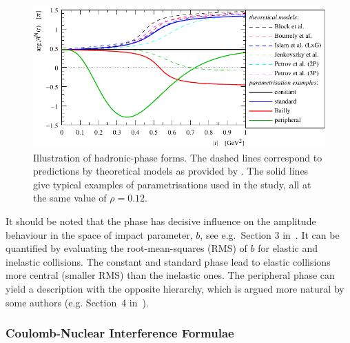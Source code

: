 \begin{figure}
\begin{center}
\includegraphics{fig/hadronic_phase_illustration.pdf}
\caption{Illustration of hadronic-phase forms. The dashed lines correspond to predictions by theoretical models as provided by \cite{elegent}. The solid lines give typical examples of parametrisations used in the study, all at the same value of $\rho = 0.12$.}
\label{fig:phase illustration}
\end{center}
\end{figure}

It should be noted that the phase has decisive influence on the amplitude behaviour in the space of impact parameter, $b$, see e.g.~Section 3 in~\cite{klk02}. It can be quantified by evaluating the root-mean-squares (RMS) of $b$ for elastic and inelastic collisions. The constant and standard phase lead to elastic collisions more central (smaller RMS) than the inelastic ones. The peripheral phase can yield a description with the opposite hierarchy, which is argued more natural by some authors (e.g. Section~4 in~\cite{kl96}).

\subsubsection{Coulomb-Nuclear Interference Formulae}
\label{sec:cni interference}

